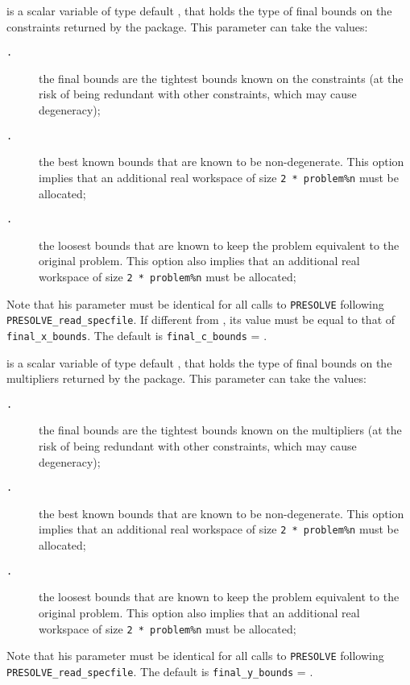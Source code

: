 \documentclass{galahad}
\newcommand{\packagename}{PRESOLVE}
\newcommand{\sym}{\tt\small}
\begin{document}
\begin{description}
 is a scalar variable of type default \integer, that
holds the type of final bounds on the constraints returned by
the package.  This parameter can take the values:
\begin{description}
\item[\sym \galsymtightest.] the final bounds are the tightest bounds
                known on the constraints (at the risk of
                being redundant with other constraints,
                which may cause degeneracy);
\item[\sym \galsymnondegenerate.] the best known bounds that are known to
                      be non-degenerate. This option implies
                      that an additional real workspace of size
                      {\tt 2 * problem\%n} must be allocated;
\item[\sym \galsymloosest.] the loosest bounds that are known to
               keep the problem equivalent to the
               original problem. This option also
               implies that an additional real workspace of size
               {\tt 2 * problem\%n} must be allocated;
\end{description}
Note that his parameter must be identical for all calls to
{\tt \packagename} following {\tt \packagename\_read\_specfile}.
If different from {\tt \galsymtightest}, its value must be equal to
that of {\tt final\_x\_bounds}.
The default is {\tt final\_c\_bounds} = {\sym \galsymtightest}.

 is a scalar variable of type default \integer, that
holds the type of final bounds on the multipliers returned by
the package.  This parameter can take the values:
\begin{description}
\item[\sym \galsymtightest.] the final bounds are the tightest bounds
                known on the multipliers (at the risk of
                being redundant with other constraints,
                which may cause degeneracy);
\item[\sym \galsymnondegenerate.] the best known bounds that are known to
                      be non-degenerate. This option implies
                      that an additional real workspace of size
                      {\tt 2 * problem\%n} must be allocated;
\item[\sym \galsymloosest.] the loosest bounds that are known to
               keep the problem equivalent to the
               original problem. This option also
               implies that an additional real workspace of size
               {\tt 2 * problem\%n} must be allocated;
\end{description}
Note that his parameter must be identical for all calls to
{\tt \packagename} following {\tt \packagename\_read\_specfile}.
The default is {\tt final\_y\_bounds} = {\sym \galsymtightest}.


\end{description}
\end{document}
